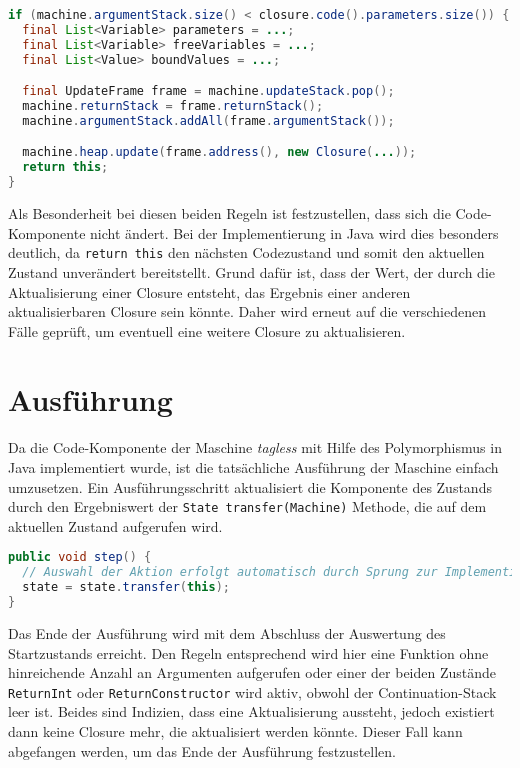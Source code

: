 \begin{lstlisting}[language=java, caption={Implementierung der Erkennung von Aktualisierungen bei Funktionen}, label={lst:rule-17}]
if (machine.argumentStack.size() < closure.code().parameters.size()) {
  final List<Variable> parameters = ...;
  final List<Variable> freeVariables = ...;
  final List<Value> boundValues = ...;

  final UpdateFrame frame = machine.updateStack.pop();
  machine.returnStack = frame.returnStack();
  machine.argumentStack.addAll(frame.argumentStack());

  machine.heap.update(frame.address(), new Closure(...));
  return this;
}
\end{lstlisting}


Als Besonderheit bei diesen beiden Regeln ist festzustellen, dass sich die Code-Komponente nicht ändert.
Bei der Implementierung in Java wird dies besonders deutlich, da \texttt{return this} den nächsten Codezustand und somit den aktuellen Zustand unverändert bereitstellt.
Grund dafür ist, dass der Wert, der durch die Aktualisierung einer Closure entsteht, das Ergebnis einer anderen aktualisierbaren Closure sein könnte.
Daher wird erneut auf die verschiedenen Fälle geprüft, um eventuell eine weitere Closure zu aktualisieren.


\section{Ausführung}\label{sec:runtime}

Da die Code-Komponente der Maschine \textit{tagless} mit Hilfe des Polymorphismus in Java implementiert wurde, ist die tatsächliche Ausführung der Maschine einfach umzusetzen.
Ein Ausführungsschritt aktualisiert die Komponente des Zustands durch den Ergebniswert der \texttt{State transfer(Machine)} Methode, die auf dem aktuellen Zustand aufgerufen wird.

\begin{lstlisting}[language=java]
public void step() {
  // Auswahl der Aktion erfolgt automatisch durch Sprung zur Implementierung.
  state = state.transfer(this);
}
\end{lstlisting}

Das Ende der Ausführung wird mit dem Abschluss der Auswertung des Startzustands erreicht.
Den Regeln entsprechend wird hier eine Funktion ohne hinreichende Anzahl an Argumenten aufgerufen oder einer der beiden Zustände \texttt{ReturnInt} oder \texttt{ReturnConstructor} wird aktiv, obwohl der Continuation-Stack leer ist.
Beides sind Indizien, dass eine Aktualisierung aussteht, jedoch existiert dann keine Closure mehr, die aktualisiert werden könnte.
Dieser Fall kann abgefangen werden, um das Ende der Ausführung festzustellen.


